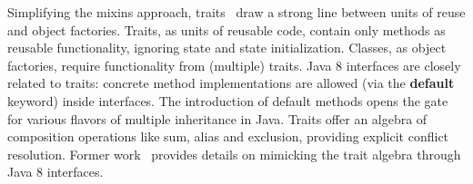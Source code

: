 Simplifying the mixins approach, traits~\cite{scharli03traits} draw a strong
line between units of reuse and object factories. Traits, as units of reusable
code, contain only methods as reusable functionality, ignoring state and state
initialization. Classes, as object factories, require functionality from
(multiple) traits. Java 8 interfaces are closely related to
traits: concrete method implementations are allowed (via the \textbf{default}
keyword) inside interfaces. The introduction of default methods opens the gate
for various flavors of multiple inheritance in Java. Traits offer an algebra
of composition operations like sum, alias and exclusion, providing explicit conflict
resolution. Former work~\cite{bono14} provides details on mimicking the trait
algebra through Java 8 interfaces.

\begin{comment}
We briefly recall the main points of their
encoding; however we propose a different representation of \textbf{exclusion}.
The first author of~\cite{bono14} agreed (via personal communication) that
our revised version for exclusion is cleaner, typesafe and more direct.
\newcommand\shortItem{\vspace{-1ex}}
\begin{itemize}
\item \textbf{Symmetric sum} can be obtained by simple multiple inheritance between interfaces.
    \begin{lstlisting}
    interface A { int x(); }
    interface B { int y(); }
    interface C extends A, B {}
    \end{lstlisting}
\shortItem
\item \textbf{Overriding} a conflict is obtained by specifying which super interface take precedence.
    \begin{lstlisting}
    interface A { default int m() {return 1;} }
    interface B { default int m() {return 2;} }
    interface C extends A, B {
        default int m() {return B.super.m();} }
    \end{lstlisting}
\shortItem
\item \textbf{Alias} is creating  a new method delegating to the existing super interface.
    \begin{lstlisting}
    interface A { default int m() {return 1;} }
    interface B extends A {
        default int k() {return A.super.m();} }
    \end{lstlisting}
\shortItem

\item \textbf{Exclusion}: exclusion is also supported in Java, where method declarations can hide the default methods correspondingly in the super interfaces.
    \begin{lstlisting}
    interface A { default int m() {return 1;} }
    interface B extends A { int m(); }
    \end{lstlisting}
\shortItem
\end{itemize}
\end{comment}

